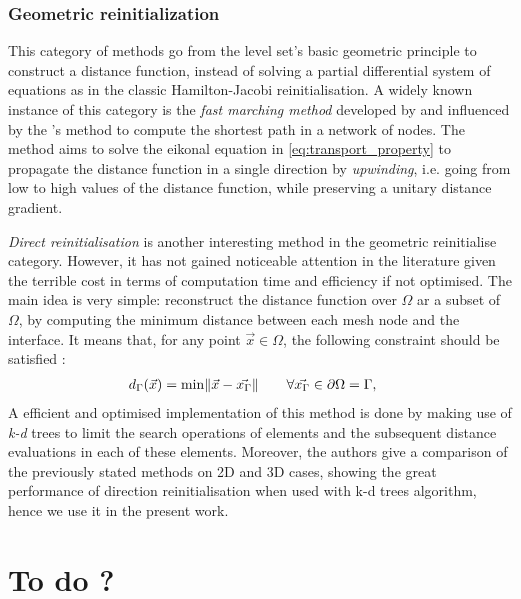 \subsubsection{Geometric reinitialization}
%
This category of methods go from the level set's basic geometric principle to construct a distance function,
instead of solving a partial differential system of equations as in the classic Hamilton-Jacobi reinitialisation.
A widely known instance of this category is the \emph{fast marching method} developed by \citet{sethian_fast_1996}
and influenced by the \citet{dijkstra_note_1959}'s method to compute the shortest path in a network of nodes. 
The method aims to solve the eikonal equation in \cref{eq:transport_property} to propagate the distance function in a 
single direction by \emph{upwinding}, i.e. going from low to high values of the distance function, 
while preserving a unitary distance gradient.

\emph{Direct reinitialisation} is another interesting method in the geometric reinitialise category. However,
it has not gained noticeable attention in the literature given the terrible cost in terms of computation time and efficiency if not optimised.
The main idea is very simple: reconstruct the distance function over $\Omega$ ar a subset of $\Omega$, by computing the 
minimum distance between each mesh node and the interface. It means that, for any point $\vec{x} \in \Omega$, the following 
constraint should be satisfied \citet{osher_signed_2003}:
\begin{align}
\label{eq:min_distance}
& d_\Gamma(\vec{x}) = \min \lVert \vec{x}-\vec{x_\Gamma} \rVert \qquad \forall \vec{x_\Gamma} \in \partial \Omega = \Gamma,
\end{align}
A efficient and optimised implementation of this method is done by \citet{shakoor_efficient_2015} making use of \emph{k-d} trees
to limit the search operations of elements and the subsequent distance evaluations in each of these elements.
Moreover, the authors give a comparison of the previously stated methods on 2D and 3D cases, showing the great 
performance of direction reinitialisation when used with k-d trees algorithm, hence we use it in the present work.
%
\section*{To do ?}

















